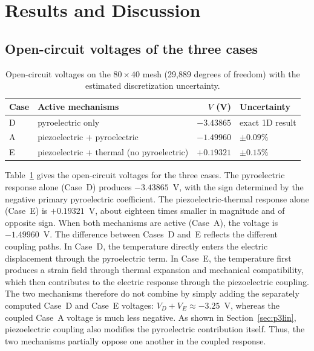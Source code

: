 \documentclass[a4paper, 11pt, twoside]{article}
\begin{document}
\section{Results and Discussion}
\label{sec:results}

\subsection{Open-circuit voltages of the three cases}
\label{sec:voltages}

\begin{table}[h]
\centering
\caption{Open-circuit voltages on the $80\times40$ mesh (29{,}889 degrees of freedom)
with the estimated discretization uncertainty.}
\label{tab:results}
\begin{tabular}{@{}llrl@{}}
\toprule
Case & Active mechanisms & $V$ (V) & Uncertainty \\
\midrule
D & pyroelectric only & $-3.43865$ & exact 1D result \\
A & piezoelectric + pyroelectric & $-1.49960$ & $\pm0.09\%$ \\
E & piezoelectric + thermal (no pyroelectric) & $+0.19321$ & $\pm0.15\%$ \\
\bottomrule
\end{tabular}
\end{table}

Table~\ref{tab:results} gives the open-circuit voltages for the three cases. The
pyroelectric response alone (Case~D) produces $-3.43865$~V, with the sign determined
by the negative primary pyroelectric coefficient. The piezoelectric-thermal response
alone (Case~E) is $+0.19321$~V, about eighteen times smaller in magnitude and of
opposite sign. When both mechanisms are active (Case~A), the voltage is
$-1.49960$~V. The difference between Cases~D and~E reflects the different coupling
paths. In Case~D, the temperature directly enters the electric displacement through
the pyroelectric term. In Case~E, the temperature first produces a strain field
through thermal expansion and mechanical compatibility, which then contributes to the
electric response through the piezoelectric coupling. The two mechanisms therefore
do not combine by simply adding the separately computed Case~D and Case~E voltages:
$V_D+V_E\approx-3.25$~V, whereas the coupled Case~A voltage is much less negative.
As shown in Section~\ref{sec:p3lin}, piezoelectric coupling also modifies the
pyroelectric contribution itself. Thus, the two mechanisms partially oppose one
another in the coupled response.
\end{document}

